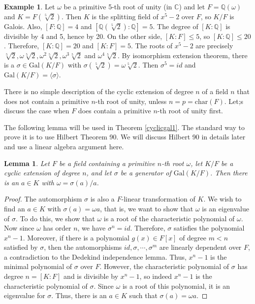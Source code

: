 \documentclass[12pt]{report}
\newtheorem{lemma}[thm]{Lemma}
\theoremstyle{definition}
\newtheorem{example}[thm]{Example}
\def\CC{\mathbb{C}}
\def\QQ{\mathbb{Q}}
\def\Gal{\text{Gal}}
\def\char{\text{char}}
\begin{document}
\begin{example}
    Let $\omega$ be a primitive 5-th root of unity (in $\CC$) and let $F=\QQ(\omega)$ and $K=F(\sqrt[5]{2})$. Then $K$ is the splitting field of $x^5-2$ over $F$, so $K/F$ is Galois. Also, $[F:\QQ]=4$ and $[\QQ(\sqrt[5]{2}):\QQ]=5$. The degree of $[K:\QQ]$ is divisible by 4 and 5, hence by 20. On the other side, $[K:F]\leq 5$, so $[K:\QQ]\leq 20$. Therefore, $[K:\QQ]=20$ and $[K:F]=5$. The roots of $x^5-2$ are precisely $\sqrt[5]{2},\omega\sqrt[5]{2},\omega^2\sqrt[5]{2},\omega^3\sqrt[5]{2}$ and $\omega^4\sqrt[5]{2}$. By isomorphism extension theorem, there is a $\sigma\in \Gal(K/F)$ with $\sigma(\sqrt[5]{2})=\omega \sqrt[5]{2}$. Then $\sigma^5=id$ and $\Gal(K/F)=\langle \sigma\rangle$.
\end{example}

There is no simple description of the cyclic extension of degree $n$ of a field $n$ that does not contain a primitive $n$-th root of unity, unless $n=p=\char(F)$. Let;s discuss the case when $F$ does contain a primitive $n$-th root of unity first.

The following lemma will be used in Theorem \ref{cyclicgal1}. The standard way to prove it is to use Hilbert Theorem 90. We will discuss Hilbert 90  in details later and use a linear algebra argument here.

\begin{lemma}\label{cycliclem1}
    Let $F$ be a field containing a primitive $n$-th root $\omega$, let $K/F$ be a cyclic extension of degree $n$, and let $\sigma$ be a generator of $\Gal(K/F)$. Then there is an $a\in K$ with $\omega=\sigma(a)/a$.
\end{lemma}
\begin{proof}
    The automorphism $\sigma$ is also a $F$-linear transformation of $K$. We wish to find an $a\in K$ with $\sigma(a)=\omega a$, that is, we want to show that $\omega$ is an eigenvalue of $\sigma$. To do this, we show that $\omega$ is a root of the characteristic polynomial of $\omega$. Now since $\omega$ has order $n$, we have $\sigma^n=id$. Therefore, $\sigma$ satisfies the polynomial $x^n-1$. Moreover, if there is a polynomial $g(x)\in F[x]$ of degree $m<n$ satisfied by $\sigma$, then the automorphisms $id,\sigma,\cdots,\sigma^{m}$ are linearly dependent over $F$, a contradiction to the Dedekind independence lemma. Thus, $x^n-1$ is the minimal polynomial of $\sigma$ over $F$. However, the characteristic polynomial of $\sigma$ has degree $n=[K:F]$ and is divisible by $x^n-1$, so indeed $x^n-1$ is the characteristic polynomial of $\sigma$. Since $\omega$ is a root of this polynomial, it is an eigenvalue for $\sigma$. Thus, there is an $a\in K$ such that $\sigma(a)=\omega a$.
\end{proof}
\end{document}
